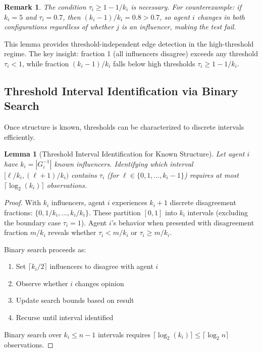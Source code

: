 \documentclass[conference]{IEEEtran}
\newtheorem{lemma}{Lemma}
\newtheorem{remark}{Remark}
\begin{document}
\begin{remark}
The condition $\tau_i \geq 1 - 1/k_i$ is \emph{necessary}. For counterexample: if $k_i = 5$ and $\tau_i = 0.7$, then $(k_i-1)/k_i = 0.8 > 0.7$, so agent $i$ changes in \emph{both} configurations regardless of whether $j$ is an influencer, making the test fail.
\end{remark}

This lemma provides threshold-independent edge detection in the high-threshold regime. The key insight: fraction 1 (all influencers disagree) exceeds any threshold $\tau_i < 1$, while fraction $(k_i-1)/k_i$ falls below high thresholds $\tau_i \geq 1 - 1/k_i$.

\subsection{Threshold Interval Identification via Binary Search}

Once structure is known, thresholds can be characterized to discrete intervals efficiently.

\begin{lemma}[Threshold Interval Identification for Known Structure]
\label{lem:threshold_detection}
Let agent $i$ have $k_i = |G^{-1}_i|$ known influencers. Identifying which interval $[\ell/k_i, (\ell+1)/k_i)$ contains $\tau_i$ (for $\ell \in \{0, 1, \ldots, k_i-1\}$) requires at most $\lceil \log_2(k_i) \rceil$ observations.
\end{lemma}

\begin{proof}
With $k_i$ influencers, agent $i$ experiences $k_i+1$ discrete disagreement fractions: $\{0, 1/k_i, \ldots, k_i/k_i\}$. These partition $[0,1]$ into $k_i$ intervals (excluding the boundary case $\tau_i = 1$). Agent $i$'s behavior when presented with disagreement fraction $m/k_i$ reveals whether $\tau_i < m/k_i$ or $\tau_i \geq m/k_i$.

Binary search proceeds as:
\begin{enumerate}
\item Set $\lceil k_i/2 \rceil$ influencers to disagree with agent $i$
\item Observe whether $i$ changes opinion
\item Update search bounds based on result
\item Recurse until interval identified
\end{enumerate}

Binary search over $k_i \leq n-1$ intervals requires $\lceil \log_2(k_i) \rceil \leq \lceil \log_2 n \rceil$ observations.
\end{proof}
\end{document}
